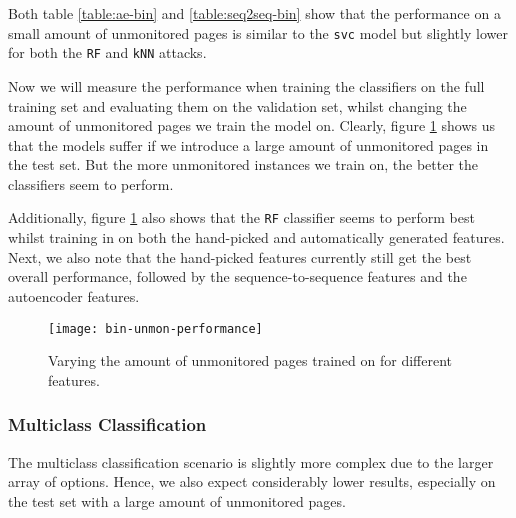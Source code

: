Both table \ref{table:ae-bin} and \ref{table:seq2seq-bin} show that the performance on a small amount of unmonitored pages is similar to the \texttt{svc} model but slightly lower for both the \texttt{RF} and \texttt{kNN} attacks.

Now we will measure the performance when training the classifiers on the full training set and evaluating them on the validation set, whilst changing the amount of unmonitored pages we train the model on.
Clearly, figure \ref{fig:bin-unmon-performance} shows us that the models suffer if we introduce a large amount of unmonitored pages in the test set.
But the more unmonitored instances we train on, the better the classifiers seem to perform.

Additionally, figure \ref{fig:bin-unmon-performance} also shows that the \texttt{RF} classifier seems to perform best whilst training in on both the hand-picked and automatically generated features.
Next, we also note that the hand-picked features currently still get the best overall performance, followed by the sequence-to-sequence features and the autoencoder features.

\begin{figure}[ht]
  \centering
  \texttt{[image: bin-unmon-performance]}
  \caption{Varying the amount of unmonitored pages trained on for different features.}
  \label{fig:bin-unmon-performance}
\end{figure}

\subsubsection{Multiclass Classification}

The multiclass classification scenario is slightly more complex due to the larger array of options.
Hence, we also expect considerably lower results, especially on the test set with a large amount of unmonitored pages.

